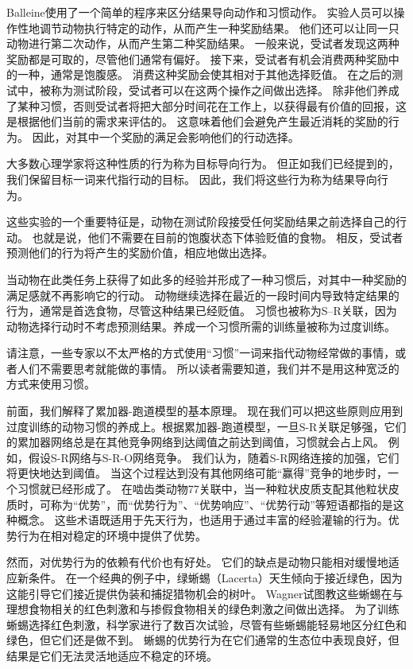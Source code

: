 Balleine\cite{balleine2003effect}使用了一个简单的程序来区分结果导向动作和习惯动作。
实验人员可以操作性地调节动物执行特定的动作，从而产生一种奖励结果。
他们还可以让同一只动物进行第二次动作，从而产生第二种奖励结果。
一般来说，受试者发现这两种奖励都是可取的，尽管他们通常有偏好。
接下来，受试者有机会消费两种奖励中的一种，通常是饱腹感。
消费这种奖励会使其相对于其他选择贬值。
在之后的测试中，被称为测试阶段，受试者可以在这两个操作之间做出选择。
除非他们养成了某种习惯，否则受试者将把大部分时间花在工作上，以获得最有价值的回报，这是根据他们当前的需求来评估的。
这意味着他们会避免产生最近消耗的奖励的行为。
因此，对其中一个奖励的满足会影响他们的行动选择。\par


大多数心理学家将这种性质的行为称为目标导向行为。
但正如我们已经提到的，我们保留目标一词来代指行动的目标。
因此，我们将这些行为称为结果导向行为。\par


这些实验的一个重要特征是，动物在测试阶段接受任何奖励结果之前选择自己的行动。
也就是说，他们不需要在目前的饱腹状态下体验贬值的食物。
相反，受试者预测他们的行为将产生的奖励价值，相应地做出选择。\par


当动物在此类任务上获得了如此多的经验并形成了一种习惯后，对其中一种奖励的满足感就不再影响它的行动。
动物继续选择在最近的一段时间内导致特定结果的行为，通常是首选食物，尽管这种结果已经贬值。
习惯也被称为S–R关联，因为动物选择行动时不考虑预测结果。养成一个习惯所需的训练量被称为过度训练。\par


请注意，一些专家以不太严格的方式使用“习惯”一词来指代动物经常做的事情，或者人们不需要思考就能做的事情。
所以读者需要知道，我们并不是用这种宽泛的方式来使用习惯。\par


前面，我们解释了累加器-跑道模型的基本原理。
现在我们可以把这些原则应用到过度训练的动物习惯的养成上。根据累加器-跑道模型，一旦S-R关联足够强，它们的累加器网络总是在其他竞争网络到达阈值之前达到阈值，习惯就会占上风。
例如，假设S-R网络与S-R-O网络竞争。
我们认为，随着S-R网络连接的加强，它们将更快地达到阈值。
当这个过程达到没有其他网络可能“赢得”竞争的地步时，一个习惯就已经形成了。
在啮齿类动物77关联中，当一种粒状皮质支配其他粒状皮质时，可称为“优势”，而“优势行为”、“优势响应”、“优势行动”等短语都指的是这种概念。
这些术语既适用于先天行为，也适用于通过丰富的经验灌输的行为。优势行为在相对稳定的环境中提供了优势。\par


然而，对优势行为的依赖有代价也有好处。
它们的缺点是动物只能相对缓慢地适应新条件。
在一个经典的例子中，绿蜥蜴（Lacerta）天生倾向于接近绿色，因为这能引导它们接近提供伪装和捕捉猎物机会的树叶。
Wagner\cite{wagner1932farbensinn}试图教这些蜥蜴在与理想食物相关的红色刺激和与掺假食物相关的绿色刺激之间做出选择。
为了训练蜥蜴选择红色刺激，科学家进行了数百次试验，尽管有些蜥蜴能轻易地区分红色和绿色，但它们还是做不到。
蜥蜴的优势行为在它们通常的生态位中表现良好，但结果是它们无法灵活地适应不稳定的环境。\par


